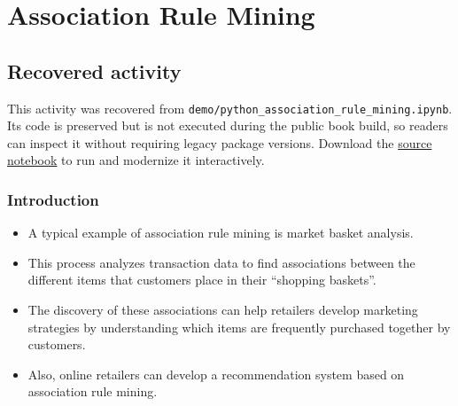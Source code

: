 \documentclass[
  letterpaper,
]{scrbook}
\providecommand{\tightlist}{%
  \setlength{\itemsep}{0pt}\setlength{\parskip}{0pt}}
\begin{document}
\chapter*{Association Rule Mining}\label{ch-lab-association-rules}


\section*{Recovered activity}\label{sec-lab-association-rules}


\begin{tcolorbox}[enhanced jigsaw, arc=.35mm, bottomrule=.15mm, bottomtitle=1mm, breakable, colback=white, colbacktitle=quarto-callout-note-color!10!white, colframe=quarto-callout-note-color-frame, coltitle=black, left=2mm, leftrule=.75mm, opacityback=0, opacitybacktitle=0.6, rightrule=.15mm, title=\textcolor{quarto-callout-note-color}{\faInfo}\hspace{0.5em}{Historical source and execution note}, titlerule=0mm, toprule=.15mm, toptitle=1mm]

This activity was recovered from
\texttt{demo/python\_association\_rule\_mining.ipynb}. Its code is
preserved but is not executed during the public book build, so readers
can inspect it without requiring legacy package versions. Download the
\href{../notebooks/association-rules.ipynb}{source notebook} to run and
modernize it interactively.

\end{tcolorbox}

\subsection*{Introduction}\label{introduction-1}

\begin{itemize}
\tightlist
\item
  A typical example of association rule mining is market basket
  analysis.
\item
  This process analyzes transaction data to find associations between
  the different items that customers place in their ``shopping
  baskets''.
\item
  The discovery of these associations can help retailers develop
  marketing strategies by understanding which items are frequently
  purchased together by customers.
\item
  Also, online retailers can develop a recommendation system based on
  association rule mining.
\end{itemize}
\end{document}
